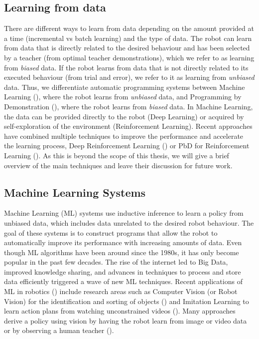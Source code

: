 \subsection{Learning from data} \label{subsec:Gathering data}
There are different ways to learn from data depending on the amount provided at a time (incremental vs batch learning) and the type of data.
The robot can learn from data that is directly related to the desired behaviour and has been selected by a teacher (\eg from optimal teacher demonstrations), which we refer to as learning from \textit{biased} data.
If the robot learns from data that is not directly related to its executed behaviour (\eg from trial and error), we refer to it as learning from \textit{unbiased} data.
Thus, we differentiate automatic programming systems between Machine Learning (), where the robot learns from \textit{unbiased} data, and Programming by Demonstration (), where the robot learns from \textit{biased} data.
In Machine Learning, the data can be provided directly to the robot (\eg Deep Learning) or acquired by self-exploration of the environment (\eg Reinforcement Learning).
Recent approaches have combined multiple techniques to improve the performance and accelerate the learning process, \eg Deep Reinforcement Learning (\cite{arulkumaran2017brief}) or PbD for Reinforcement Learning (\cite{hester2017learning}).
As this is beyond the scope of this thesis, we will give a brief overview of the main techniques and leave their discussion for future work.


\subsection{Machine Learning Systems}\label{sssec:Learning Systems}
Machine Learning (ML) systems use inductive inference to learn a policy from unbiased data, which includes data unrelated to the desired robot behaviour.
The goal of these systems is to construct programs that allow the robot to automatically improve its performance with increasing amounts of data. 
Even though ML algorithms have been around since the 1980s, it has only become popular in the past few decades. 
The rise of the internet led to Big Data, improved knowledge sharing, and advances in techniques to process and store data efficiently triggered a wave of new ML techniques.
Recent applications of ML in robotics (\cite{mlrobotics}) include research areas such as Computer Vision (or Robot Vision) for the identification and sorting of objects (\cite{stager2013computer}) and Imitation Learning to learn action plans from watching unconstrained videos (\cite{Yang2015}).
Many approaches derive a policy using vision by having the robot learn from image or video data or by observing a human teacher (\cite{kuniyoshi1994learning}).

